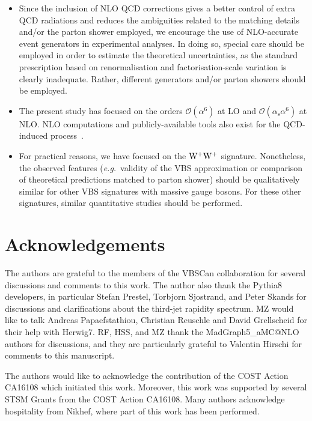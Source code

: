 \documentclass[twocolumn,epjc3]{svjour3} %
\newcommand{\alphas}{\ensuremath{\alpha_\text{s}}\xspace}
\begin{document}
\begin{itemize}
    \item Since the inclusion of NLO QCD corrections gives a better control of extra QCD radiations and reduces the ambiguities related to the 
        matching details and/or the parton shower employed, we encourage the use of NLO-accurate event generators in experimental analyses. In doing
        so, special care should be employed in order to estimate the theoretical uncertainties, as the standard prescription based on 
        renormalisation and factorisation-scale variation is clearly inadequate. Rather, different generators and/or parton showers should be employed.

    \item The present study has focused on the orders $\mathcal{O}{\left(\alpha^{6}\right)}$ at 
    LO and $\mathcal{O}{\left(\alphas\alpha^{6}\right)}$ at NLO. NLO computations and publicly-available tools also exist for the QCD-induced process~\cite{Rauch:2016pai,Melia:2010bm,Melia:2011gk,Campanario:2013gea,Baglio:2014uba,Biedermann:2017bss,Alwall:2014hca}.

    \item For practical reasons, we have focused on the ${\rm W}^+{\rm W}^+$ signature. Nonetheless, 
    the observed features 
    (\emph{e.g.}\ validity of the VBS approximation or comparison of theoretical predictions matched to parton shower) should 
    be qualitatively similar for other VBS signatures with massive gauge bosons. For these other signatures, similar quantitative studies should be performed.
\end{itemize}


\section*{Acknowledgements}

The authors are grateful to the members of the VBSCan collaboration for several discussions and comments to this work. The author also thank
the {\sc Pythia8} developers, in particular Stefan Prestel, Torbjorn Sjostrand, and Peter Skands for 
discussions and clarifications about the third-jet rapidity spectrum. MZ would like to talk Andreas Papaefstathiou, Christian Reuschle and David Grellscheid 
for their help with {\sc Herwig7}. RF, HSS, and MZ thank the {\sc MadGraph5\_aMC@NLO} authors for discussions, and
they are particularly grateful to Valentin Hirschi for comments to this manuscript.

The authors would like to acknowledge the contribution of the COST Action CA16108 which initiated this work.
Moreover, this work was supported by several STSM Grants from the COST Action CA16108.
Many authors acknowledge hospitality from Nikhef, where part of this work has been performed.
\end{document}
